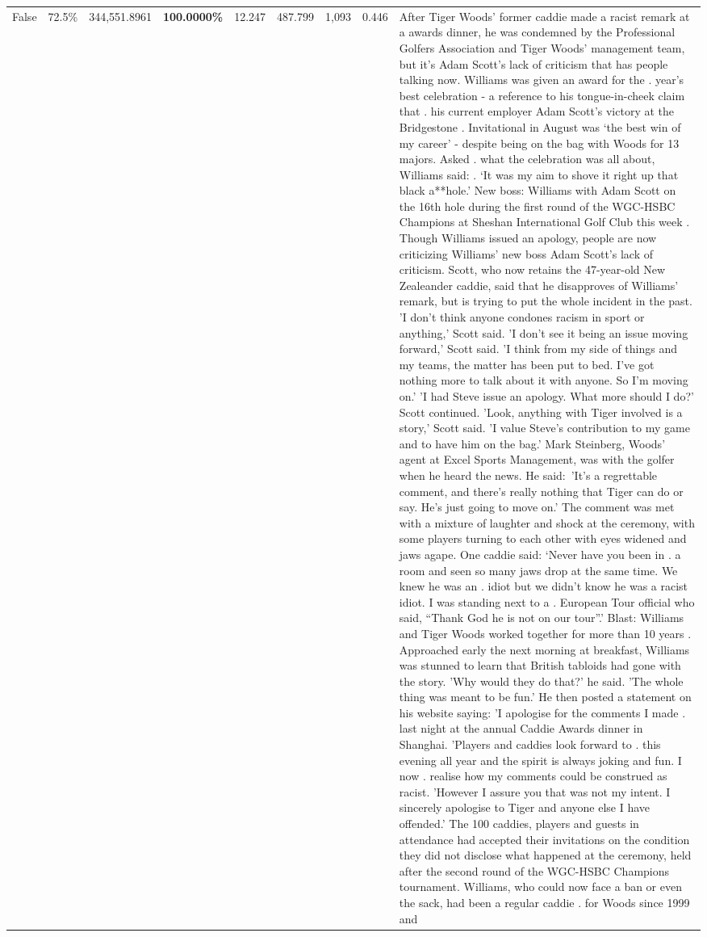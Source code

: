 \begin{table}[H]
\begin{tabular}{lllrlllll}
False & 72.5\% & 344,551.8961 & \bfseries \color{red} 100.0000\% & 12.247 & 487.799 & 1,093 & 0.446 & After Tiger Woods' former caddie made a racist remark at a awards dinner, he was condemned by the Professional Golfers Association and Tiger Woods' management team, but it's Adam Scott's lack of criticism that has people talking now. Williams was given an award for the . year’s best celebration - a reference to his tongue-in-cheek claim that . his current employer Adam Scott’s victory at the Bridgestone . Invitational in August was ‘the best win of my career’ - despite being on the bag with Woods for 13 majors. Asked . what the celebration was all about, Williams said: . ‘It was my aim to shove it right up that black a**hole.’ New boss: Williams with Adam Scott  on the 16th hole during the first round of the WGC-HSBC Champions at Sheshan International Golf Club this week . Though Williams issued an apology, people are now criticizing Williams' new boss Adam Scott's lack of criticism. Scott, who now retains the 47-year-old New Zealeander caddie, said that he disapproves of Williams' remark, but is trying to put the whole incident in the past. 'I don't think anyone condones racism in sport or anything,' Scott said. 'I don't see it being an issue moving forward,' Scott said. 'I think from my side of things and my teams, the matter has been put to bed. I've got nothing more to talk about it with anyone. So I'm moving on.' 'I had Steve issue an apology. What more should I do?' Scott continued. 'Look, anything with Tiger involved is a story,' Scott said. 'I value Steve's contribution to my game and to have him on the bag.' Mark Steinberg, Woods' agent at Excel Sports Management, was with the golfer when he heard the news. He said: 'It's a regrettable comment, and there's really nothing that Tiger can do or say. He's just going to move on.' The comment was met with a mixture of laughter and shock at the ceremony, with some players turning to each other with eyes widened and jaws agape. One caddie said: ‘Never have you been in . a room and seen so many jaws drop at the same time. We knew he was an . idiot but we didn’t know he was a racist idiot. I was standing next to a . European Tour official who said, “Thank God he is not on our tour”.’ Blast: Williams and Tiger Woods worked together for more than 10 years . Approached early the next morning at breakfast, Williams was stunned to learn that British tabloids had gone with the story. 'Why would they do that?' he said. 'The whole thing was meant to be fun.' He then posted a statement on his website saying: 'I apologise for the comments I made . last night at the annual Caddie Awards dinner in Shanghai. 'Players and caddies look forward to . this evening all year and the spirit is always joking and fun. I now . realise how my comments could be construed as racist. 'However I assure you that was not my intent. I sincerely apologise to Tiger and anyone else I have offended.' The 100 caddies, players and guests in attendance had accepted their invitations on the condition they did not disclose what happened at the ceremony, held after the second round of the WGC-HSBC Champions tournament. Williams, who could now face a ban or even the sack, had been a regular caddie . for Woods since 1999 and 
\end{tabular}
\end{table}
